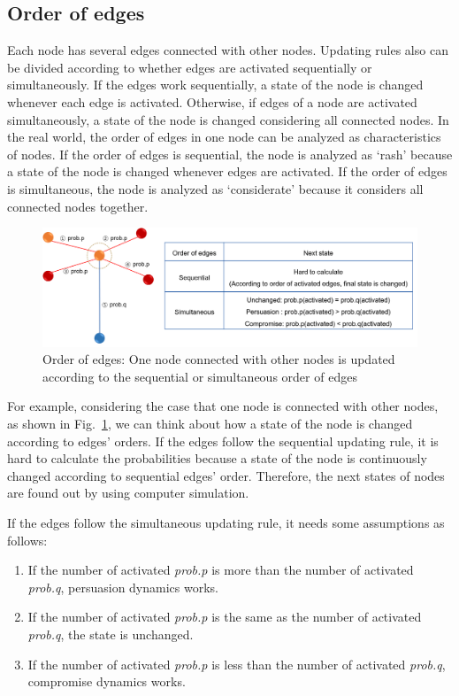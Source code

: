 \subsection{Order of edges}
\label{order of edge}
Each node has several edges connected with other nodes. Updating rules also can be divided according to whether edges are activated sequentially or simultaneously. If the edges work sequentially, a state of the node is changed whenever each edge is activated. Otherwise, if edges of a node are activated simultaneously, a state of the node is changed considering all connected nodes. In the real world, the order of edges in one node can be analyzed as characteristics of nodes. If the order of edges is sequential, the node is analyzed as `rash' because a state of the node is changed whenever edges are activated. If the order of edges is simultaneous, the node is analyzed as `considerate' because it considers all connected nodes together. 

\begin{figure}[!htb]
	\centering
	\includegraphics[width=\hsize]{figure/chap4_edgeorder_explanation.png}
	\caption{Order of edges: One node connected with other nodes is updated according to the sequential or simultaneous order of edges}
	\label{edgeorder_explanation}
\end{figure}  

For example, considering the case that one node is connected with other nodes, as shown in Fig.~\ref{edgeorder_explanation}, we can think about how a state of the node is changed according to edges' orders. If the edges follow the sequential updating rule, it is hard to calculate the probabilities because a state of the node is continuously changed according to sequential edges' order. Therefore, the next states of nodes are found out by using computer simulation.

If the edges follow the simultaneous updating rule, it needs some assumptions as follows: 
\begin{enumerate}
	\item If the number of activated \textit{prob.p} is more than the number of activated \textit{prob.q}, persuasion dynamics works. 
	\item If the number of activated \textit{prob.p} is the same as the number of activated \textit{prob.q}, the state is unchanged.
	\item If the number of activated \textit{prob.p} is less than the number of activated \textit{prob.q}, compromise dynamics works.
\end{enumerate}


